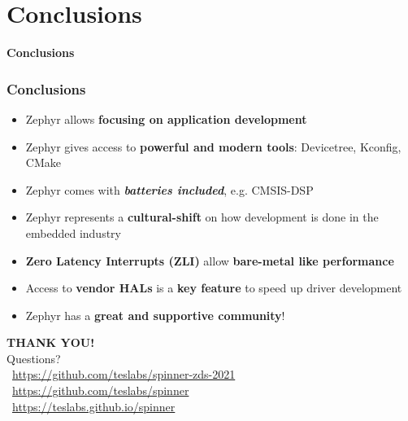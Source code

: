 \documentclass[handout]{beamer}
\begin{document}

\section{Conclusions}

\begin{frame}[plain]{}
  \begin{center}
    \Huge
    \textbf{Conclusions}
  \end{center}
\end{frame}

\begin{frame}
  \frametitle{Conclusions}

  \begin{itemize}
    \item<1-> Zephyr allows \textbf{focusing on application development}
    \item<2-> Zephyr gives access to \textbf{powerful and modern tools}:
          Devicetree, Kconfig, CMake
    \item<3-> Zephyr comes with \textit{\textbf{batteries included}}, e.g.
          CMSIS-DSP
    \item<4-> Zephyr represents a \textbf{cultural-shift} on how development is
          done in the embedded industry
    \item<5-> \textbf{Zero Latency Interrupts (ZLI)} allow \textbf{bare-metal
            like performance}
    \item<6-> Access to \textbf{vendor HALs} is a \textbf{key feature} to speed
          up driver development
    \item<7-> Zephyr has a \textbf{great and supportive community}!
  \end{itemize}
\end{frame}

\begin{frame}[c]
  \begin{center}
    \huge
    \textbf{THANK YOU!} \\
    Questions? \\
    \vspace{2.5em}
    \normalsize
    \faFilePowerpoint~\url{https://github.com/teslabs/spinner-zds-2021} \\
    \vspace{1.5em}
    \faGithub~\url{https://github.com/teslabs/spinner} \\
    \faBook~\url{https://teslabs.github.io/spinner}
  \end{center}
\end{frame}
\end{document}
